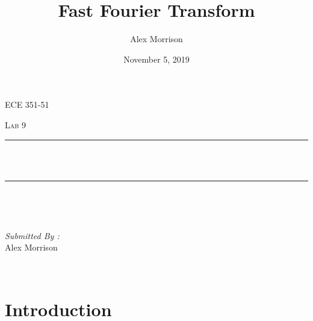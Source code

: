 \documentclass[12pt]{report}
\title{Fast Fourier Transform}
\author{ Alex Morrison}
\date{November 5, 2019}
\makeatletter
\let\thetitle\@title
\makeatother
\begin{document}

\begin{titlepage}
	\centering
    \vspace*{0.5 cm}
\begin{center}    \textsc{\Large ECE 351-51}\\[2.0 cm]	\end{center}%
	\textsc{\Large  Lab 9}\\[0.5 cm]				%
	\rule{\linewidth}{0.2 mm} \\[0.4 cm]
	{ \huge \bfseries \thetitle}\\
	\rule{\linewidth}{0.2 mm} \\[1.5 cm]
	
	\begin{minipage}{0.4\textwidth}
		\begin{flushleft} \large
			\end{flushleft}
			\end{minipage}~
			\begin{minipage}{0.4\textwidth}
            
			\begin{flushright} \large
			\emph{Submitted By :} \\
			Alex Morrison  
		\end{flushright}
           
	\end{minipage}\\[2 cm]
	

    
    
    
    
	
\end{titlepage}


\tableofcontents
\pagebreak

\renewcommand{\thesection}{\arabic{section}}
\section{Introduction}
\end{document}
